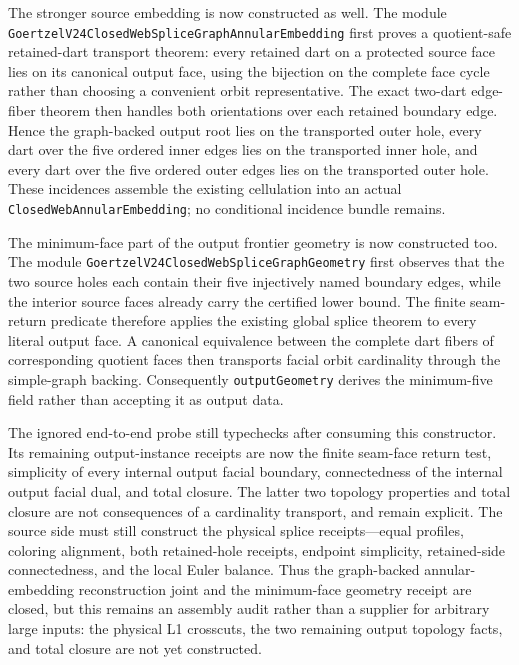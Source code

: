 \documentclass[11pt]{article}
\theoremstyle{definition}
\begin{document}
The stronger source embedding is now constructed as well.  The module
\texttt{GoertzelV24ClosedWebSpliceGraphAnnularEmbedding} first proves a
quotient-safe retained-dart transport theorem: every retained dart on a
protected source face lies on its canonical output face, using the bijection
on the complete face cycle rather than choosing a convenient orbit
representative.  The exact two-dart edge-fiber theorem then handles both
orientations over each retained boundary edge.  Hence the graph-backed output
root lies on the transported outer hole, every dart over the five ordered
inner edges lies on the transported inner hole, and every dart over the five
ordered outer edges lies on the transported outer hole.  These incidences
assemble the existing cellulation into an actual
\texttt{ClosedWebAnnularEmbedding}; no conditional incidence bundle remains.

The minimum-face part of the output frontier geometry is now constructed too.
The module
\texttt{GoertzelV24ClosedWebSpliceGraphGeometry} first observes that the two
source holes each contain their five injectively named boundary edges, while
the interior source faces already carry the certified lower bound.  The
finite seam-return predicate therefore applies the existing global splice
theorem to every literal output face.  A canonical equivalence between the
complete dart fibers of corresponding quotient faces then transports facial
orbit cardinality through the simple-graph backing.  Consequently
\texttt{outputGeometry} derives the minimum-five field rather than accepting
it as output data.

The ignored end-to-end probe still typechecks after consuming this constructor.
Its remaining output-instance receipts are now the finite seam-face return
test, simplicity of every internal output facial boundary, connectedness of
the internal output facial dual, and total closure.  The latter two topology
properties and total closure are not consequences of a cardinality transport,
and remain explicit.  The source side must still construct the physical
splice receipts---equal profiles, coloring alignment, both retained-hole
receipts, endpoint simplicity, retained-side connectedness, and the local
Euler balance.  Thus the graph-backed annular-embedding reconstruction joint
and the minimum-face geometry receipt are closed, but this remains an assembly
audit rather than a supplier for arbitrary large inputs: the physical L1
crosscuts, the two remaining output topology facts, and total closure are not
yet constructed.
\end{document}
